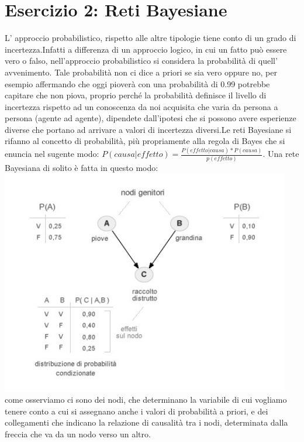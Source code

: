 		\section{Esercizio 2: Reti Bayesiane}
		\label{sec:es2}
		L' approccio probabilistico, rispetto alle altre tipologie tiene conto di un grado di incertezza.Infatti a differenza di un approccio logico, in cui un fatto può essere vero o falso, nell'approccio probabilistico si considera la probabilità di quell' avvenimento. Tale probabilità non ci dice a priori se sia vero oppure no, per esempio affermando che oggi pioverà con una probabilità di 0.99 potrebbe capitare che non piova, proprio perché la probabilità definisce il livello di incertezza rispetto ad un conoscenza da noi acquisita che varia da persona a persona (agente ad agente), dipendete dall'ipotesi che si possono avere esperienze diverse che portano ad arrivare a valori di incertezza diversi.Le reti Bayesiane si rifanno al concetto di probabilità, più propriamente alla regola di Bayes che si enuncia nel sugente modo: $P(causa|effetto)=\frac{P(effetto|causa)*P(causa)}{p(effetto)}$. Una rete Bayesiana di solito è fatta in questo modo:
		\includegraphics[width=0.95\textwidth, height=0.40\textheight]{retebayesiana.jpg}
		come osserviamo ci sono dei nodi, che determinano la variabile di cui vogliamo tenere conto a cui si assegnano anche i valori di probabilità a priori, e dei collegamenti che indicano la relazione di causalità tra i nodi, determinata dalla freccia che va da un nodo verso un altro.
		\par 
